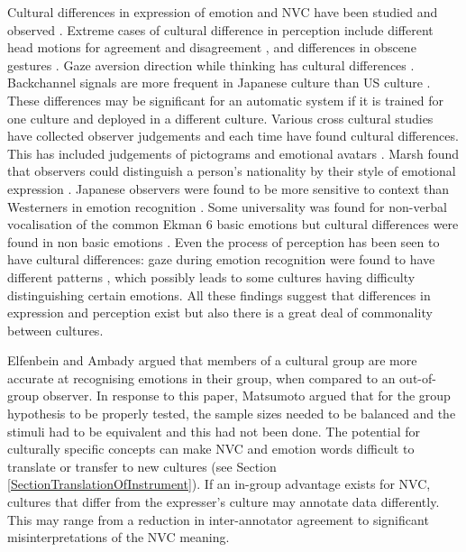Cultural differences in expression of emotion and \ac{NVC} have been studied and observed \cite{Matsumoto2006}. Extreme cases of cultural difference in perception include different head motions for agreement and disagreement \cite{Kassabova2008}, and differences in obscene gestures \cite{Knapp2009}. Gaze aversion direction while thinking has cultural differences \cite{McCarthy2006}. Backchannel signals are more frequent in Japanese culture than \acs{US} culture \cite{White1989}. These differences may be significant for an automatic system if it is trained for one culture and deployed in a different culture. Various cross cultural studies have collected observer judgements and each time have found cultural differences. This has included judgements of pictograms \cite{Cho2007} and emotional avatars \cite{Massaro96, Koda2007}. Marsh \etal found that observers could distinguish a person's nationality by their style of emotional expression \cite{Marsh2003}. Japanese observers were found to be more sensitive to context than Westerners in emotion recognition \cite{Masuda2008}. Some universality was found for non-verbal vocalisation of the common Ekman 6 basic emotions but cultural differences were found in non basic emotions \cite{Sauter2009}. Even the process of perception has been seen to have cultural differences: gaze during emotion recognition were found to have different patterns \cite{Jack2009}, which possibly leads to some cultures having difficulty distinguishing certain emotions. All these findings suggest that differences in expression and perception exist but also there is a great deal of commonality between cultures.


Elfenbein and Ambady \cite{Elfenbein2002b, Elfenbein2002} argued that members of a cultural group are more accurate at recognising emotions in their group, when compared to an out-of-group observer. In response to this paper, Matsumoto argued that for the group hypothesis to be properly tested, the sample sizes needed to be balanced and the stimuli had to be equivalent \cite{Matsumoto2006} and this had not been done. The potential for culturally specific concepts can make \ac{NVC} and emotion words difficult to translate or transfer to new cultures (see Section \ref{SectionTranslationOfInstrument}). If an in-group advantage exists for \ac{NVC}, cultures that differ from the expresser's culture may annotate data differently. This may range from a reduction in inter-annotator agreement to significant misinterpretations of the \ac{NVC} meaning. %

